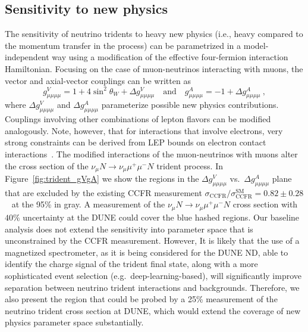 \subsection{Sensitivity to new physics} 
The sensitivity of neutrino tridents to heavy new physics (i.e., heavy compared to the momentum transfer in the process) can be parametrized in a model-independent way using a modification of the effective four-fermion interaction Hamiltonian. Focusing on the case of muon-neutrinos interacting with muons, the vector and axial-vector couplings can be written as
\begin{equation}
g_{\mu\mu\mu\mu}^V = 1 + 4 \sin^2\theta_W + \Delta g_{\mu\mu\mu\mu}^V \quad \mathrm{and} \quad g_{\mu\mu\mu\mu}^A = -1 + \Delta g_{\mu\mu\mu\mu}^A ~,
\end{equation}
where $\Delta g_{\mu\mu\mu\mu}^V$ and $\Delta g_{\mu\mu\mu\mu}^A$ parameterize possible new physics contributions. Couplings involving other combinations of lepton flavors can be modified analogously. Note, however, that for interactions that involve electrons, very strong constraints can be derived from LEP bounds on electron contact interactions~\cite{Schael:2013ita}. The modified interactions of the muon-neutrinos with muons alter the cross section of the $\nu_\mu N \to \nu_\mu \mu^+\mu^- N$ trident process. In Figure~\ref{fig:trident_gVgA} we show the regions in the $\Delta g^V_{\mu\mu\mu\mu}$ vs.\ $\Delta g^A_{\mu\mu\mu\mu}$ plane that are excluded by the existing CCFR measurement $\sigma_\text{CCFR} / \sigma_\text{CCFR}^\text{SM} = 0.82 \pm 0.28$~\cite{Mishra:1991bv} at the 95\%  in gray. A measurement of the $\nu_\mu N \to \nu_\mu \mu^+\mu^- N$ cross section with $40\%$ uncertainty at the DUNE   could cover the blue hashed regions. Our baseline analysis does not extend the sensitivity into parameter space that is unconstrained by the CCFR measurement. However, It is likely that the use of a magnetized spectrometer, as it is being considered for the DUNE ND, able to identify the charge signal of the trident final state, along with a more sophisticated  event selection (e.g.\ deep-learning-based), will significantly improve separation between neutrino trident interactions and backgrounds. Therefore, we also present the region that could be probed by a 25\% measurement of the neutrino trident cross section at DUNE, which would extend the coverage of new physics parameter space substantially.

